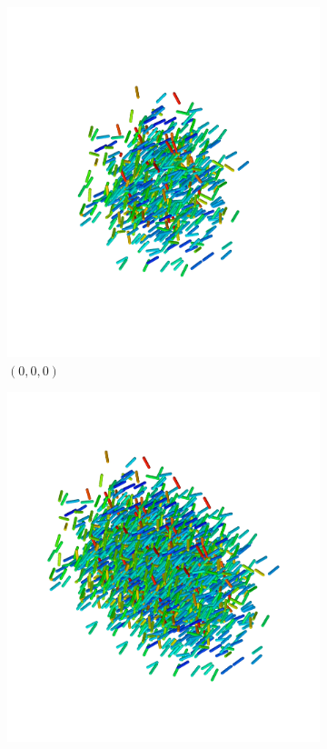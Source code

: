\begin{figure}
  \begin{center}
    \begin{subfigure}{0.3\textwidth}
      \includegraphics[width=\textwidth]{assets/images/periodic/1}
      \caption{$(0,0,0)$}
      \label{fig:periodic_1}
    \end{subfigure}
        \begin{subfigure}{0.3\textwidth}
      \includegraphics[width=\textwidth]{assets/images/periodic/2}

\end{subfigure}
\end{center}
\end{figure}
